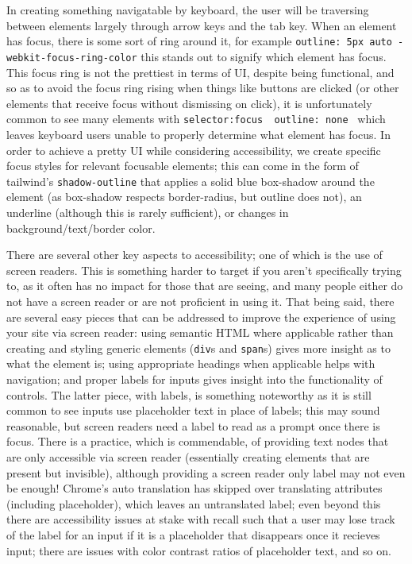 \documentclass[11pt, twoside, reqno]{book}
\begin{document}
In creating something navigatable by keyboard, the user will be traversing between elements largely through arrow keys and the tab key. When an element has focus, there is some sort of ring around it, for example \texttt{outline: 5px auto -webkit-focus-ring-color} this stands out to signify which element has focus. This focus ring is not the prettiest in terms of UI, despite being functional, and so as to avoid the focus ring rising when things like buttons are clicked (or other elements that receive focus without dismissing on click), it is unfortunately common to see many elements with \texttt{selector:focus { outline: none }} which leaves keyboard users unable to properly determine what element has focus. In order to achieve a pretty UI while considering accessibility, we create specific focus styles for relevant focusable elements; this can come in the form of tailwind's \texttt{shadow-outline} that applies a solid blue box-shadow around the element (as box-shadow respects border-radius, but outline does not), an underline (although this is rarely sufficient), or changes in background/text/border color.

There are several other key aspects to accessibility; one of which is the use of screen readers. This is something harder to target if you aren't specifically trying to, as it often has no impact for those that are seeing, and many people either do not have a screen reader or are not proficient in using it. That being said, there are several easy pieces that can be addressed to improve the experience of using your site via screen reader: using semantic HTML where applicable rather than creating and styling generic elements (\texttt{div}s and \texttt{span}s) gives more insight as to what the element is; using appropriate headings when applicable helps with navigation; and proper labels for inputs gives insight into the functionality of controls. The latter piece, with labels, is something noteworthy as it is still common to see inputs use placeholder text in place of labels; this may sound reasonable, but screen readers need a label to read as a prompt once there is focus. There \textit{}is\textit{} a practice, which is commendable, of providing text nodes that are only accessible via screen reader (essentially creating elements that are present but invisible), although providing a screen reader only label may not even be enough! Chrome's auto translation has skipped over translating attributes (including placeholder), which leaves an untranslated label; even beyond this there are accessibility issues at stake with recall such that a user may lose track of the label for an input if it is a placeholder that disappears once it recieves input; there are issues with color contrast ratios of placeholder text, and so on.
\end{document}
